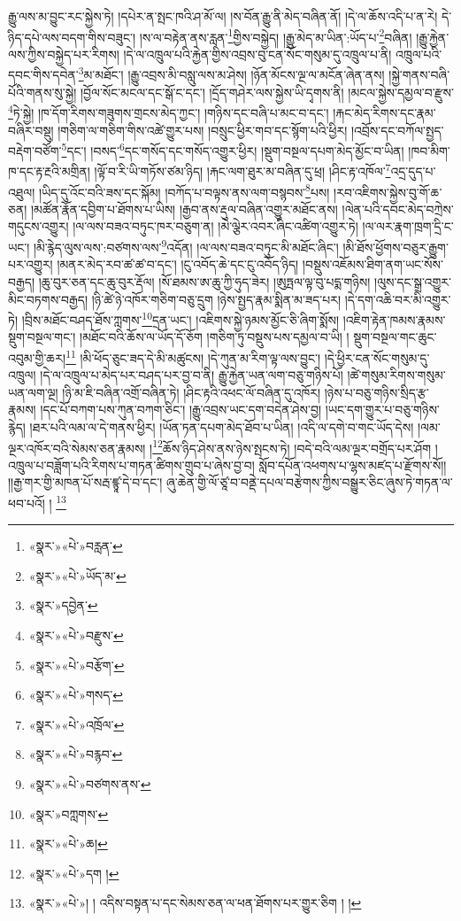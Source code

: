 རྒྱུ་ལས་མ་བྱུང་རང་སྐྱེས་ཏེ། །དཔེར་ན་སྤང་ཁའི་ཤ་མོ་ལ། །ས་བོན་རྒྱུ་ནི་མེད་བཞིན་ནོ། །དེ་ལ་ཆོས་འདི་པ་ན་རེ། དེ་ཉིད་དཔེ་ལས་བདག་གིས་བཟུང་། །ས་ལ་བརྟེན་ནས་རླན་\footnote{«སྣར་»«པེ་»བརླན་}གྱིས་བསྐྱེད། །རྒྱུ་མེད་མ་ཡིན་:ཡོད་པ་\footnote{«སྣར་»«པེ་»ཡོད་མ་}བཞིན། །རྒྱུ་རྐྱེན་ལས་ཀྱིས་བསྐྱེད་པར་རིགས། །དེ་ལ་འཁྲུལ་པའི་རྐྱེན་གྱིས་འབྲས་བུ་ངན་སོང་གསུམ་དུ་འཁྲུལ་པ་ནི། འཁྲུལ་པའི་དབང་གིས་དབེན་\footnote{«སྣར་»དབྱེན་}མ་མཐོང་། །རྒྱུ་འབྲས་མི་བསླུ་ལས་མ་ཤེས། །ཉོན་མོངས་ལྔ་ལ་མངོན་ཞེན་ནས། །སྐྱེ་གནས་བཞི་པོའི་གནས་སུ་སྐྱེ། །བྱོལ་སོང་མངལ་དང་སྒོ་ང་དང་། །དྲོད་གཤེར་ལས་སྐྱེས་ཡི་དྭགས་ནི། །མངལ་སྐྱེས་དམྱལ་བ་རྫུས་\footnote{«སྣར་»«པེ་»བརྫུས་}ཏེ་སྐྱེ། །ཁ་དོག་རིགས་གཟུགས་གྲངས་མེད་ཀྱང་། །གཉིས་དང་བཞི་པ་མང་བ་དང་། །རྐང་མེད་རིགས་དང་རྣམ་བཞིར་བསྡུ། །གཅིག་ལ་གཅིག་གིས་འཚེ་གྱུར་པས། །བསྲུང་ཕྱིར་གབ་དང་སྙོག་པའི་ཕྱིར། །འབྲོས་དང་བཀོལ་སྤྱད་བརྡེག་བཙོག་\footnote{«སྣར་»«པེ་»བརྩོག་}དང་། །བསད་\footnote{«སྣར་»«པེ་»གསད་}དང་གསོད་དང་གསོད་འགྱུར་ཕྱིར། །སྡུག་བསྔལ་དཔག་མེད་མྱོང་བ་ཡིན། །ཁབ་མིག་ཁ་དང་རྟ་རྔའི་མགྲིན། །ལྟོ་བ་རི་ཡི་གཏོས་ཙམ་ཉིད། །རྐང་ལག་ཐུར་མ་བཞིན་དུ་ཕྲ། །ཤིང་རྟ་འཁོལ་\footnote{«སྣར་»«པེ་»འཁྲོལ་}འདྲ་དུད་པ་འཐུལ། །ཡིད་དུ་འོང་བའི་ཟས་དང་སྐོམ། །བཀོད་པ་བལྟས་ནས་ལག་བསྙབས་\footnote{«སྣར་»«པེ་»བརྙབ་}པས། །རབ་འཇིགས་སྐྱེས་བུ་གོ་ཆ་ཅན། །མཚོན་རྣོན་དབྱིག་པ་ཐོགས་པ་ཡིས། །རྒྱབ་ནས་རྡུལ་བཞིན་འགྱུར་མཐོང་ནས། །ལེན་པའི་དབང་མེད་བཀྲེས་གདུངས་འགྱུར། །ལ་ལས་བཟའ་བཏུང་ཁར་བཅུག་ན། །མེ་ལྕེར་འབར་ཞིང་འཚིག་འགྱུར་ཏེ། །ལ་ལར་རྣག་ཁྲག་དྲི་ང་ཡང་། །མི་རྙེད་ལུས་ལས་:བཙགས་ལས་\footnote{«སྣར་»«པེ་»བཙགས་ནས་}འདོན། །ལ་ལས་བཟའ་བཏུང་མི་མཐོང་ཞིང་། །མི་ཐོས་ཕྱོགས་བཅུར་རྒྱུག་པར་འགྱུར། །མནར་མེད་རབ་ཚ་ཚ་བ་དང་། །ངུ་འབོད་ཆེ་དང་ངུ་འབོད་ཉིད། །བསྡུས་འཇོམས་ཐིག་ནག་ཡང་སོས་བརྒྱད། །ཆུ་བུར་ཅན་དང་ཆུ་བུར་རྡོལ། །སོ་ཐམས་ཨ་ཆུ་ཀྱི་ཧུད་ཟེར། །ཨུཏྤལ་ལྟ་བུ་པདྨ་གཉིས། །ལུས་དང་སྒྲ་འགྱུར་མིང་བཏགས་བརྒྱད། །ཉི་ཚེ་ཉེ་འཁོར་གཅིག་བཅུ་དྲུག །ཉེས་སྤྱད་རྣམ་སྨིན་མ་ཟད་པར། །དེ་དག་འཆི་བར་མི་འགྱུར་ཏེ། །བྲིས་མཐོང་བཤད་ཐོས་ཀླགས་\footnote{«སྣར་»བཀླགས་}དྲན་ཡང་། །འཇིགས་སྐྱེ་ཉམས་མྱོང་ཅི་ཞིག་སྨོས། །འཇིག་རྟེན་ཁམས་རྣམས་སྡུག་བསྔལ་གང་། །མཐོང་བའི་ཆོས་ལ་ཡོད་དོ་ཅོག །གཅིག་ཏུ་བསྡུས་པས་དམྱལ་བ་ཡི། །
སྡུག་བསྔལ་གང་ཆུང་འབུམ་གྱི་ཆར།\footnote{«སྣར་»«པེ་»ཆ།} །མི་ཕོད་ཅུང་ཟད་དེ་མི་མཚུངས། །དེ་ཀུན་མ་རིག་ལྟ་ལས་བྱུང་། །དེ་ཕྱིར་ངན་སོང་གསུམ་དུ་འཁྲུལ། །དེ་ལ་འཁྲུལ་པ་མེད་པར་བཤད་པར་བྱ་བ་ནི། རྒྱུ་རྐྱེན་ཡན་ལག་བཅུ་གཉིས་པོ། །ཚེ་གསུམ་རིགས་གསུམ་ཡན་ལག་ལྔ། །ཉི་མ་ཇི་བཞིན་འགྲོ་བཞིན་ཏེ། །ཤིང་རྟའི་འཕང་ལོ་བཞིན་དུ་འཁོར། །ཉེས་པ་བཅུ་གཉིས་སྲིད་རྩ་རྣམས། །དང་པོ་བཀག་པས་ཀུན་བཀག་ཅིང་། །རྒྱུ་འབྲས་ཡང་དག་བདེན་ཤེས་བྱ། །ཡང་དག་གྱུར་པ་བཅུ་གཉིས་རྙེད། །ཐར་པའི་ལམ་ལ་དེ་གནས་ཕྱིར། །ཡོན་ཏན་དཔག་མེད་ཐོབ་པ་ཡིན། །འདི་ལ་དགེ་བ་གང་ཡོད་དེས། །ལམ་ལྔར་འཁོར་བའི་སེམས་ཅན་རྣམས། །\footnote{«སྣར་»«པེ་»དག །}ཆོས་ཉིད་ཤེས་ནས་ཉེས་སྤངས་ཏེ། །བདེ་བའི་ལམ་ལྔར་བགྲོད་པར་ཤོག །འཁྲུལ་པ་བཟློག་པའི་རིགས་པ་གཏན་ཚིགས་གྲུབ་པ་ཞེས་བྱ་བ། སློབ་དཔོན་འཕགས་པ་ལྷས་མཛད་པ་རྫོགས་སོ།། །།རྒྱ་གར་གྱི་མཁན་པོ་སརྦ་ཛྙཱ་དེ་བ་དང་། ཞུ་ཆེན་གྱི་ལོ་ཙཱ་བ་བནྡེ་དཔལ་བརྩེགས་ཀྱིས་བསྒྱུར་ཅིང་ཞུས་ཏེ་གཏན་ལ་ཕབ་པའོ། ། \footnote{«སྣར་»«པེ་»། ། འདིས་བསྟན་པ་དང་སེམས་ཅན་ལ་ཕན་ཐོགས་པར་གྱུར་ཅིག ། །}